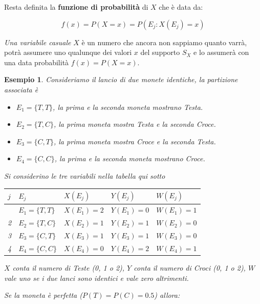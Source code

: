 \documentclass[
  11pt,
]{book}
\providecommand{\tightlist}{%
  \setlength{\itemsep}{0pt}\setlength{\parskip}{0pt}}
\theoremstyle{mytheoremstyle}
\theoremstyle{mydefstyle}
\newtheorem{example}{{Esempio}}[section]
\begin{document}
Resta definita la \textbf{funzione di probabilità} di \(X\) che è data da:

\[
f(x)=P(X=x)=P(E_j:X(E_j)=x)
\]

\emph{Una variabile casuale} \(X\) è un numero che ancora non sappiamo quanto varrà, potrà assumere uno qualunque dei valori \(x\) del supporto \(S_X\) e lo assumerà con una data probabilità \(f(x)=P(X=x)\).

\begin{example}
Consideriamo il lancio di due monete identiche, la partizione associata è

\begin{itemize}
\tightlist
\item
  \(E_1=\{T,T\}\), la prima e la seconda moneta mostrano Testa.
\item
  \(E_2=\{T,C\}\), la prima moneta mostra Testa e la seconda Croce.
\item
  \(E_3=\{C,T\}\), la prima moneta mostra Croce e la seconda Testa.
\item
  \(E_4=\{C,C\}\), la prima e la seconda moneta mostrano Croce.
\end{itemize}

Si considerino le tre variabili nella tabella qui sotto

\begin{longtable}[]{@{}lllll@{}}
\toprule\noalign{}
\(j\) & \(E_j\) & \(X(E_j)\) & \(Y(E_j)\) & \(W(E_j)\) \\
\midrule\noalign{}
\endhead
\bottomrule\noalign{}
\endlastfoot
1 & \(E_1=\{T,T\}\) & \(X(E_1)=2\) & \(Y(E_1)=0\) & \(W(E_1)=1\) \\
2 & \(E_2=\{T,C\}\) & \(X(E_2)=1\) & \(Y(E_2)=1\) & \(W(E_2)=0\) \\
3 & \(E_3=\{C,T\}\) & \(X(E_3)=1\) & \(Y(E_3)=1\) & \(W(E_3)=0\) \\
4 & \(E_4=\{C,C\}\) & \(X(E_4)=0\) & \(Y(E_4)=2\) & \(W(E_4)=1\) \\
\end{longtable}

\(X\) conta il numero di Teste (0, 1 o 2), \(Y\) conta il numero di Croci (0, 1 o 2),
\(W\) vale uno se i due lanci sono identici e vale zero altrimenti.

Se la moneta è perfetta (\(P(T)=P(C)=0.5\)) allora:


\end{example}
\end{document}
